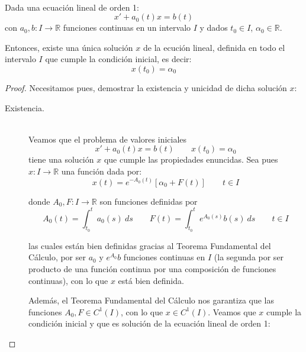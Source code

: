 \begin{prop}
    \ \\
    Dada una ecuación lineal de orden 1:
    \begin{equation*}
        x' + a_0(t)x = b(t)
    \end{equation*}
    con $a_0,b:I\rightarrow\mathbb{R}$ funciones continuas en un intervalo $I$ y dados $t_0\in I$, $\alpha_0\in \mathbb{R}$.

    Entonces, existe una única solución $x$ de la ecución lineal, definida en todo el intervalo $I$ que cumple la condición inicial, es decir:
    \begin{equation*}
        x(t_0) = \alpha_0 
    \end{equation*}
    
    \begin{proof}
        Necesitamos pues, demostrar la existencia y unicidad de dicha solución $x$:
        \begin{description}
            \item [Existencia.]~\\
                Veamos que el problema de valores iniciales
                \begin{equation*}
                    x' + a_0(t)x = b(t) \qquad x(t_0) = \alpha_0
                \end{equation*}
                tiene una solución $x$ que cumple las propiedades enuncidas. Sea pues $x:I\rightarrow\mathbb{R}$ una función dada por:
                \begin{equation*}
                    x(t) = e^{-A_0(t)} [\alpha_0 + F(t)] \qquad t\in I
                \end{equation*}

                donde $A_0,F:I\rightarrow\mathbb{R}$ son funciones definidas por
                \begin{equation*}
                    A_0(t) = \int_{t_0}^{t} a_0(s)~ds \qquad F(t) = \int_{t_0}^{t} e^{A_0(s)}b(s)~ds  \qquad t\in I
                \end{equation*}

                las cuales están bien definidas gracias al Teorema Fundamental del Cálculo, por ser $a_0$ y $e^{A_0}b$ funciones continuas en $I$ (la segunda por ser producto de una función continua por una composición de funciones continuas), con lo que $x$ está bien definida.

                Además, el Teorema Fundamental del Cálculo nos garantiza que las funciones $A_0,F\in C^1(I)$, con lo que $x\in C^1(I)$. Veamos que $x$ cumple la condición inicial y que es solución de la ecuación lineal de orden 1:


\end{description}
\end{proof}
\end{prop}
